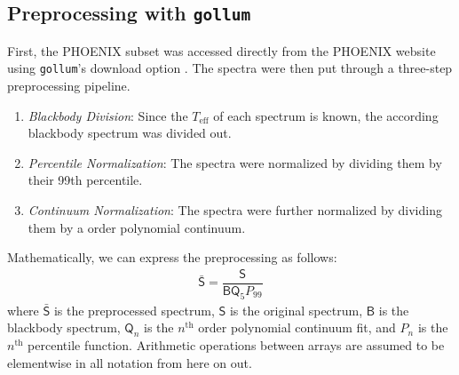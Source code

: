 \documentclass[twocolumn]{aastex631}
\begin{document}
\subsection{Preprocessing with \texttt{gollum}}
First, the PHOENIX subset was accessed directly from the PHOENIX website
using \texttt{gollum}'s download option \citep{gollum}. The spectra were then put through a 
three-step preprocessing pipeline.
\begin{enumerate}
    \item \textit{Blackbody Division}: Since the $T_{\mathrm{eff}}$ of each spectrum 
    is known, the according blackbody spectrum was divided out.
    \item \textit{Percentile Normalization}: The spectra were normalized by dividing
    them by their 99th percentile.
    \item \textit{Continuum Normalization}: The spectra were further normalized by 
    dividing them by a  order polynomial continuum.
\end{enumerate}
Mathematically, we can express the preprocessing as follows:
\begin{gather}
    \mathsf{\bar{S}} = \dfrac{\mathsf{S}}{\mathsf{B}\mathsf{Q}_5P_{99}}
\end{gather}
where $\mathsf{\bar{S}}$ is the preprocessed spectrum, $\mathsf{S}$ is the 
original spectrum,  $\mathsf{B}$ is the blackbody spectrum, $\mathsf{Q}_n$ 
is the $n^\mathrm{th}$ order polynomial continuum fit, and $P_n$ is the 
$n^\mathrm{th}$ percentile function. Arithmetic operations between arrays 
are assumed to be elementwise in all notation from here on out.
\end{document}
